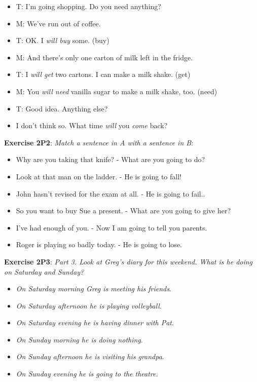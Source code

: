 \begin{itemize}

\item T: I'm going shopping. Do you need anything?
\item M: We've run out of coffee.
\item T: OK. I \textit{will buy} some. (buy)
\item M: And there's only one carton of milk left in the fridge.
\item T: I \textit{will get} two cartons. I can make a milk shake. (get)
\item M: You \textit{will need} vanilla sugar to make a milk shake, too. (need)
\item T: Good idea. Anything else?
\item I don't think so. What time \textit{will} you \textit{come} back?

\end{itemize}

\textbf{Exercise 2P2}: \textit{Match a sentence in A with a sentence in B}:

\begin{itemize}

\item Why are you taking that knife? - What are you going to do?
\item Look at that man on the ladder. - He is going to fall!
\item John hasn't revised for the exam at all. - He is going to fail..
\item So you want to buy Sue a present. - What are you going to give her?
\item I've had enough of you. - Now I am going to tell you parents.
\item Roger is playing so badly today. - He is going to lose.

\end{itemize}

\textbf{Exercise 2P3}: \textit{Part 3. Look at Greg's diary for this weekend. What is he doing on Saturday and Sunday?}

\begin{itemize}

\item \textit{On Saturday morning Greg is meeting his friends}.
\item \textit{On Saturday afternoon he is playing volleyball}.
\item \textit{On Saturday evening he is having dinner with Pat}.
\item \textit{On Sunday morning he is doing nothing}.
\item \textit{On Sunday afternoon he is visiting his grandpa}.
\item \textit{On Sunday evening he is going to the theatre}.
\end{itemize}

